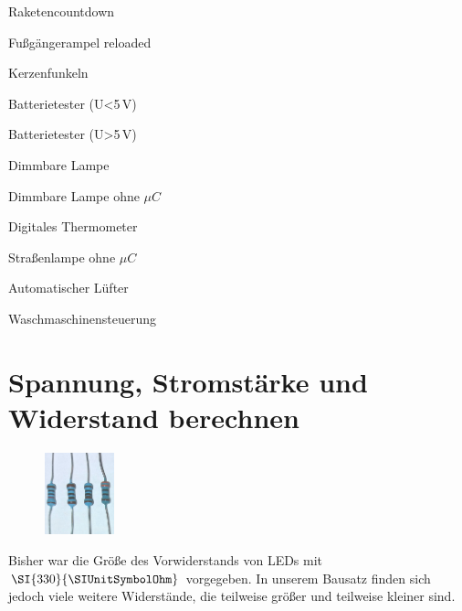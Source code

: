 \begin{projektueberblick}
	\item Raketencountdown \dotfill \pageref{proj:raketencountdown}
	\item Fußgängerampel reloaded \dotfill \pageref{proj:fussampel2}
	\item Kerzenfunkeln \dotfill \pageref{proj:kerzen}
	\item Batterietester (U<5\,V) \dotfill \pageref{proj:batterietesterklein}
	\item Batterietester (U>5\,V) \dotfill \pageref{proj:batterietestergross}
	\item Dimmbare Lampe \dotfill \pageref{proj:dimmlampe}
	\item Dimmbare Lampe ohne $\mu C$ \dotfill \pageref{proj:dimmlampeomc}
	\item Digitales Thermometer \dotfill \pageref{proj:thermometer}
	\item Straßenlampe ohne $\mu C$ \dotfill \pageref{proj:strassenlampeomc}
	\item Automatischer Lüfter \dotfill \pageref{proj:luefter}
	\item Waschmaschinensteuerung \dotfill \pageref{proj:waschmaschinensteuerung}
\end{projektueberblick}

\newpage
\nopagecolor
\section{Spannung, Stromstärke und Widerstand berechnen}
\label{sec:spannung-strom-widerstand}

\begin{figure}
	\centering
	\vspace{-\baselineskip}
	\includegraphics[width=0.18\textwidth,angle=90]{pics/Widerstaende.jpg}
	\vspace{-3\baselineskip}
	\label{abb:widerstaende}
\end{figure}
Bisher war die Größe des Vorwiderstands von LEDs mit $\SI{330}{\SIUnitSymbolOhm}$ vorgegeben. 
In unserem Bausatz finden sich jedoch viele weitere Widerstände, die teilweise größer und teilweise kleiner sind.

